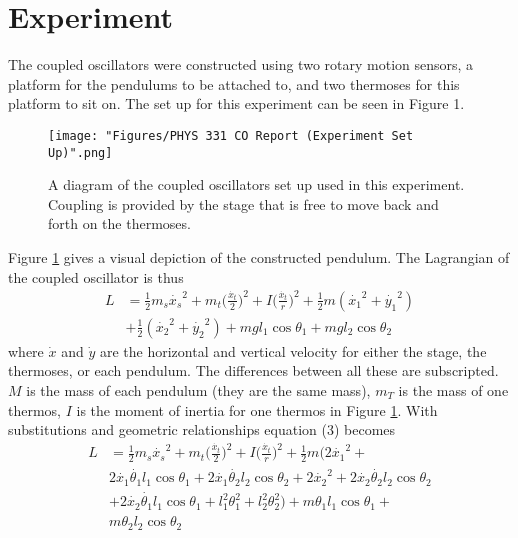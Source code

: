 \documentclass[twocolumn]{article}
\begin{document}
\section*{Experiment}
The coupled oscillators were constructed using two rotary motion sensors, a platform for the pendulums to be attached to, and two thermoses for this platform to sit on. The set up for this experiment can be seen in Figure 1.
\begin{figure}[htbp]
\begin{center}
\texttt{[image: "Figures/PHYS 331 CO Report (Experiment Set Up)".png]}
\caption{A diagram of the coupled oscillators set up used in this experiment. Coupling is provided by the stage that is free to move back and forth on the thermoses.}
\label{Diagram}
\end{center}
\end{figure}
\newline
Figure \ref{Diagram} gives a visual depiction of the constructed pendulum. The Lagrangian of the coupled oscillator is thus
\begin{equation}\label{3}
\begin{split}
L&=\frac{1}{2}m_s\dot{x_{s}}^2+m_{t}\Big(\frac{\dot{x_{t}}}{2}\Big)^2+I\Big(\frac{\dot{x_t}}{r}\Big)^2+\frac{1}{2}m(\dot{x_1}^2+\dot{y_1}^2) \\&
+\frac{1}{2}(\dot{x_2}^2+\dot{y_2}^2)+mgl_{1}\cos{\theta_1}+mgl_{2}\cos{\theta_2}
\end{split}
\end{equation}
where $\dot{x}$ and $\dot{y}$ are the horizontal and vertical velocity for either the stage, the thermoses, or each pendulum. The differences between all these are subscripted. $M$ is the mass of each pendulum (they are the same mass), $m_{T}$ is the mass of one thermos, $I$ is the moment of inertia for one thermos in Figure \ref{Diagram}. With substitutions and geometric relationships equation (3) becomes 
\begin{equation}\label{4}
\begin{split}
L&=\frac{1}{2}m_{s}\dot{x_s}^2+m_{t}\Big(\frac{\dot{x_t}}{2}\Big)^2+I\Big(\frac{\dot{x_t}}{r}\Big)^2+\frac{1}{2}m\Big(2\dot{x_1}^2+ \\&
2\dot{x_1}\dot{\theta_1}l_{1}\cos{\theta_1}+2\dot{x_1}\dot{\theta_2}l_{2}\cos{\theta_2}+2\dot{x_2}^2+2\dot{x_2}\dot{\theta_2}l_{2}\cos{\theta_2}\\& 
+2\dot{x_2}\dot{\theta_1}l_{1}\cos{\theta_1}+l_{1}^2\theta_{1}^2+l_{2}^2\theta_{2}^2\Big)+m\theta_{1}l_{1}\cos{\theta_{1}}+\\&
m\theta_{2}l_{2}\cos{\theta_{2}}  
\end{split}
\end{equation}
\end{document}

